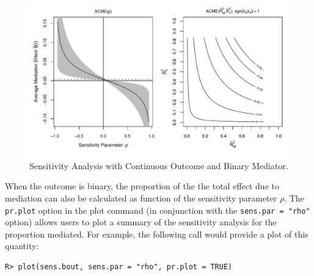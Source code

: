 \documentclass[11pt,letterpaper]{article}
\theoremstyle{plain}
\begin{document}
\begin{figure}[t]
\vspace{-.5in}
\begin{center}
\includegraphics[scale=.8]{Rho-R2-JobsBinOutcome.pdf}
\end{center}
\vspace{-.5in}
\caption{Sensitivity Analysis with Continuous Outcome and Binary Mediator.
  \label{SensBinOut}}
\end{figure}

When the outcome is binary, the proportion of the the total effect due to
mediation can also be calculated as function of the sensitivity parameter $\rho$.
The \texttt{pr.plot} option in the plot command (in conjunction with the
\texttt{sens.par = "rho"} option) allows users to plot a summary
of the sensitivity analysis for the proportion mediated. For example, the
following call would provide a plot of this quantity:
\begin{verbatim}
R> plot(sens.bout, sens.par = "rho", pr.plot = TRUE)
\end{verbatim}
\end{document}

